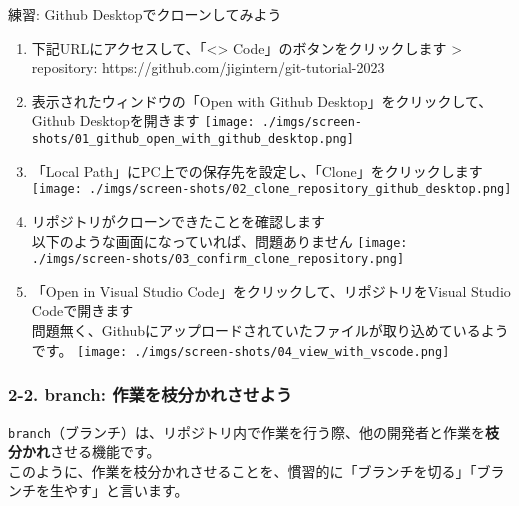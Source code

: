 練習: Github Desktopでクローンしてみよう

\begin{enumerate}
\def\labelenumi{\arabic{enumi}.}
\item
  下記URLにアクセスして、「\textless\textgreater{}
  Code」のボタンをクリックします \textgreater{} repository:
  https://github.com/jigintern/git-tutorial-2023
\item
  表示されたウィンドウの「Open with Github
  Desktop」をクリックして、Github Desktopを開きます
  \texttt{[image: ./imgs/screen-shots/01\_github\_open\_with\_github\_desktop.png]}
\item
  「Local Path」にPC上での保存先を設定し、「Clone」をクリックします
  \texttt{[image: ./imgs/screen-shots/02\_clone\_repository\_github\_desktop.png]}
\item
  リポジトリがクローンできたことを確認します\\
  以下のような画面になっていれば、問題ありません
  \texttt{[image: ./imgs/screen-shots/03\_confirm\_clone\_repository.png]}
\item
  「Open in Visual Studio Code」をクリックして、リポジトリをVisual
  Studio Codeで開きます\\
  問題無く、Githubにアップロードされていたファイルが取り込めているようです。
  \texttt{[image: ./imgs/screen-shots/04\_view\_with\_vscode.png]}
\end{enumerate}

\subsubsection{2-2. branch:
作業を枝分かれさせよう}\label{branch-ux4f5cux696dux3092ux679dux5206ux304bux308cux3055ux305bux3088ux3046}

\begin{Shaded}
\begin{Highlighting}[]

\end{Highlighting}
\end{Shaded}

\texttt{branch}（ブランチ）は、リポジトリ内で作業を行う際、他の開発者と作業を\textbf{枝分かれ}させる機能です。\\
このように、作業を枝分かれさせることを、慣習的に「ブランチを切る」「ブランチを生やす」と言います。

